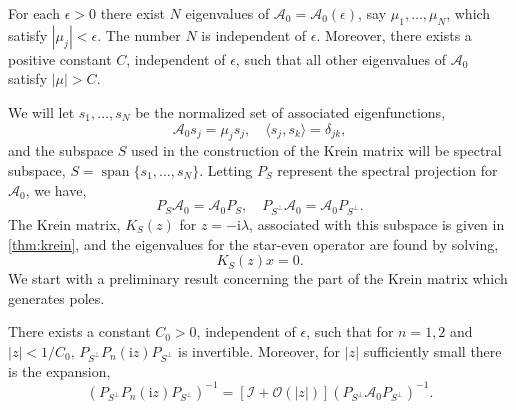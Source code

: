 \documentclass[review,onefignum,onetabnum]{siamart171218}
\def\Span{\mathop\mathrm{span}\nolimits}
\newcommand{\rmi}{\mathrm{i}}
\newcommand{\calA}{\mathcal{A}}
\newcommand{\calI}{\mathcal{I}}
\newcommand{\calO}{\mathcal{O}}
\newcommand{\vK}{\bm{\mathit{K}}}
\newcommand{\vx}{\bm{\mathit{x}}}
\begin{document}
\begin{assumption}\label{ass:smalleval}
For each $\epsilon>0$ there exist $N$ eigenvalues of $\calA_0=\calA_0(\epsilon)$, say $\mu_1,\dots,\mu_N$, which satisfy $|\mu_j|<\epsilon$. The number $N$ is independent of $\epsilon$. Moreover, there exists a positive constant $C$, independent of $\epsilon$, such that all other eigenvalues of $\calA_0$ satisfy $|\mu|>C$.
\end{assumption}

We will let $s_1,\dots,s_N$ be the normalized set of associated eigenfunctions,
\[
\calA_0s_j=\mu_js_j,\quad\langle s_j,s_k\rangle=\delta_{jk},
\]
and the subspace $S$ used in the construction of the Krein matrix will be spectral subspace, $S=\Span\{s_1,\dots,s_N\}$. Letting $P_S$ represent the spectral projection for $\calA_0$, we have,
\[
P_S\calA_0=\calA_0P_S,\quad
P_{S^\perp}\calA_0=\calA_0P_{S^\perp}.
\]
The Krein matrix, $\vK_S(z)$ for $z=-\rmi\lambda$, associated with this subspace is given in \cref{thm:krein}, and the eigenvalues for the star-even operator are found by solving,
\begin{equation}\label{e:51aa}
\vK_S(z)\vx=0.
\end{equation}
We start with a preliminary result concerning the part of the Krein matrix which generates poles.

\begin{lemma}\label{l:51}
There exists a constant $C_0>0$, independent of $\epsilon$, such that for $n=1,2$ and $|z|<1/C_0,\,P_{S^\perp}P_n(\rmi z)P_{S^\perp}$ is invertible. Moreover, for $|z|$ sufficiently small there is the expansion,
\[
\left(P_{S^\perp}P_n(\rmi z)P_{S^\perp}\right)^{-1}=
\left[\calI+\calO(|z|)\right]\left(P_{S^\perp}\calA_0P_{S^\perp}\right)^{-1}.
\]
\end{lemma}
\end{document}
